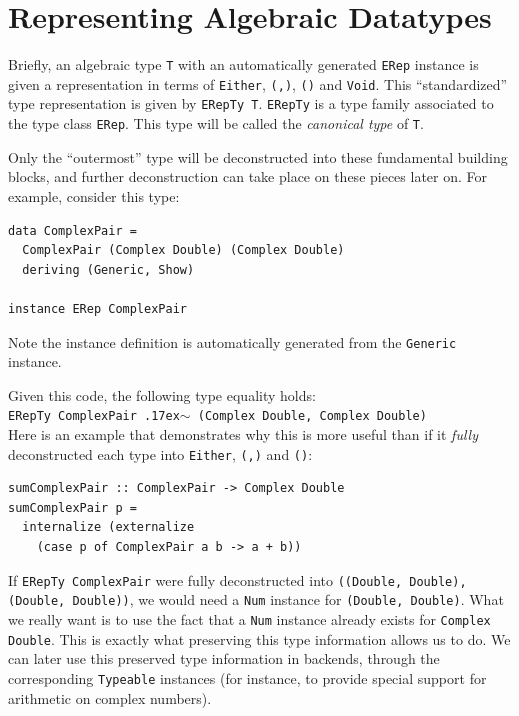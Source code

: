 \documentclass[runningheads, a4paper]{llncs}
\newcommand{\typeeq}{\raise.17ex\hbox{$\scriptstyle\mathtt{\sim}$}\,\;}
\newcommand{\ttt}{\texttt}
\begin{document}
\section{Representing Algebraic Datatypes}
\label{sec:ADTRep}

Briefly, an algebraic type \ttt{T} with an automatically generated \ttt{ERep}
instance is given a representation in terms of \ttt{Either}, \ttt{(,)}, \ttt{()}
and \ttt{Void}.  This ``standardized'' type representation is given by \ttt{ERepTy
T}. \ttt{ERepTy} is a type family associated to the type class \ttt{ERep}. This
type will be called the \textit{canonical type} of \ttt{T}.

Only the ``outermost'' type will be deconstructed into these fundamental building
blocks, and further deconstruction can take place on these pieces later on. For
example, consider this type:

\begin{lstlisting}
data ComplexPair =
  ComplexPair (Complex Double) (Complex Double)
  deriving (Generic, Show)

instance ERep ComplexPair
\end{lstlisting}

\noindent Note the instance definition is automatically generated from the \ttt{Generic}
instance.

Given this code, the following type equality holds:
\\

\ttt{ERepTy ComplexPair \typeeq (Complex Double, Complex Double)}
\\
\noindent Here is an example that demonstrates why this is more useful than if it \textit{fully} deconstructed
each type into \ttt{Either}, \ttt{(,)} and \ttt{()}:

\begin{lstlisting}
sumComplexPair :: ComplexPair -> Complex Double
sumComplexPair p =
  internalize (externalize
    (case p of ComplexPair a b -> a + b))
\end{lstlisting}

\noindent If \ttt{ERepTy ComplexPair} were fully deconstructed into \ttt{((Double, Double),
(Double, Double))}, we would need a \ttt{Num} instance for \ttt{(Double,
Double)}.  What we really want is to use the fact that a \ttt{Num} instance
already exists for \ttt{Complex Double}. This is exactly what preserving this
type information allows us to do. We can later use this preserved type
information in backends, through the corresponding \ttt{Typeable} instances (for
instance, to provide special support for arithmetic on complex numbers).
\end{document}
